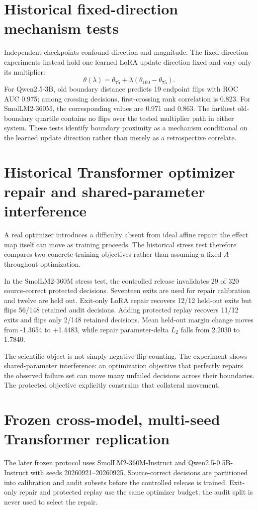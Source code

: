 \documentclass[11pt,letterpaper]{article}
\theoremstyle{plain}
\newcommand{\1}{\mathbf 1}
\begin{document}
\clearpage
\section{Historical fixed-direction mechanism tests}
Independent checkpoints confound direction and magnitude. The fixed-direction experiments instead hold one learned LoRA update direction fixed and vary only its multiplier:
\begin{equation}
 \theta(\lambda)=\theta_{75}+\lambda(\theta_{100}-\theta_{75}).
\end{equation}
For Qwen2.5-3B, old boundary distance predicts 19 endpoint flips with ROC AUC 0.975; among crossing decisions, first-crossing rank correlation is 0.823. For SmolLM2-360M, the corresponding values are 0.971 and 0.863. The farthest old-boundary quartile contains no flips over the tested multiplier path in either system. These tests identify boundary proximity as a mechanism conditional on the learned update direction rather than merely as a retrospective correlate.

\clearpage
\section{Historical Transformer optimizer repair and shared-parameter interference}
A real optimizer introduces a difficulty absent from ideal affine repair: the effect map itself can move as training proceeds. The historical stress test therefore compares two concrete training objectives rather than assuming a fixed $A$ throughout optimization.

In the SmolLM2-360M stress test, the controlled release invalidates 29 of 320 source-correct protected decisions. Seventeen exits are used for repair calibration and twelve are held out. Exit-only LoRA repair recovers 12/12 held-out exits but flips 56/148 retained audit decisions. Adding protected replay recovers 11/12 exits and flips only 2/148 retained decisions. Mean held-out margin change moves from -1.3654 to +1.4483, while repair parameter-delta $L_2$ falls from 2.2030 to 1.7840.

The scientific object is not simply negative-flip counting. The experiment shows shared-parameter interference: an optimization objective that perfectly repairs the observed failure set can move many unfailed decisions across their boundaries. The protected objective explicitly constrains that collateral movement.

\clearpage
\section{Frozen cross-model, multi-seed Transformer replication}
The later frozen protocol uses SmolLM2-360M-Instruct and Qwen2.5-0.5B-Instruct with seeds 20260921--20260925. Source-correct decisions are partitioned into calibration and audit subsets before the controlled release is trained. Exit-only repair and protected replay use the same optimizer budget; the audit split is never used to select the repair.
\end{document}
